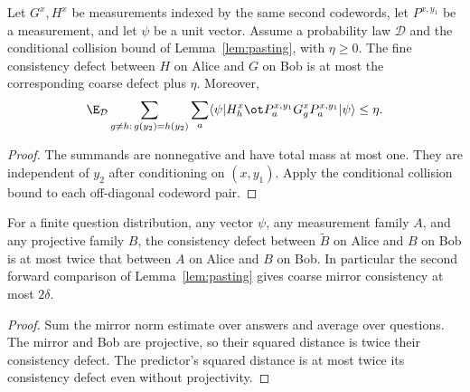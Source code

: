 \begin{lemma}
	\label{lem:pasting-distinct-collisions}
	\leanok
	Let $G^x,H^x$ be measurements indexed by the same second codewords,
	let $P^{x,y_1}$ be a measurement, and let $\psi$ be a unit vector.
	Assume a probability law $\mathcal D$ and the conditional collision bound
	of Lemma~\ref{lem:pasting}, with $\eta\geq0$.
	The fine consistency defect between $H$ on Alice and $G$ on Bob is at most
	the corresponding coarse defect plus $\eta$. Moreover,
	\[
	 \E_{\mathcal D}\sum_{g\ne h:\,g(y_2)=h(y_2)}\sum_a
	 \langle\psi|H^x_h\ot P^{x,y_1}_aG^x_gP^{x,y_1}_a|\psi\rangle
	 \leq\eta.
	\]
\end{lemma}
\begin{proof}
	\leanok
	The summands are nonnegative and have total mass at most one.
	They are independent of $y_2$ after conditioning on $(x,y_1)$.
	Apply the conditional collision bound to each off-diagonal codeword pair.
\end{proof}

\begin{lemma}
	\label{lem:pasting-schmidt-mirror-consistency}
	\leanok
	For a finite question distribution, any vector $\psi$, any measurement
	family $A$, and any projective family $B$, the consistency defect between
	$\widetilde B$ on Alice and $B$ on Bob is at most twice that between
	$A$ on Alice and $B$ on Bob. In particular the second forward comparison
	of Lemma~\ref{lem:pasting} gives coarse mirror consistency at most $2\delta$.
\end{lemma}
\begin{proof}
	\leanok
	Sum the mirror norm estimate over answers and average over questions.
	The mirror and Bob are projective, so their squared distance is twice
	their consistency defect. The predictor's squared distance is at most
	twice its consistency defect even without projectivity.
\end{proof}

